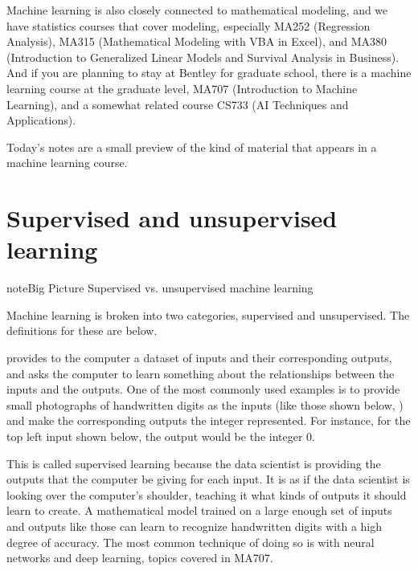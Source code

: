 \documentclass[letterpaper,10pt,english]{jupyterBook}
\begin{document}
\sphinxAtStartPar
Machine learning is also closely connected to mathematical modeling, and we have statistics courses that cover modeling, especially MA252 (Regression Analysis), MA315 (Mathematical Modeling with VBA in Excel), and MA380 (Introduction to Generalized Linear Models and Survival Analysis in Business).  And if you are planning to stay at Bentley for graduate school, there is a machine learning course at the graduate level, MA707 (Introduction to Machine Learning), and a somewhat related course CS733 (AI Techniques and Applications).

\sphinxAtStartPar
Today’s notes are a small preview of the kind of material that appears in a machine learning course.


\section{Supervised and unsupervised learning}
\label{\detokenize{chapter-17-machine-learning:supervised-and-unsupervised-learning}}
\begin{sphinxadmonition}{note}{Big Picture \sphinxhyphen{} Supervised vs. unsupervised machine learning}

\sphinxAtStartPar
Machine learning is broken into two categories, supervised and unsupervised.  The definitions for these are below.
\end{sphinxadmonition}

\sphinxAtStartPar
{} provides to the computer a dataset of inputs and their corresponding outputs, and asks the computer to learn something about the relationships between the inputs and the outputs.  One of the most commonly used examples is to provide small photographs of handwritten digits as the inputs (like those shown below, ) and make the corresponding outputs the integer represented.  For instance, for the top left input shown below, the output would be the integer 0.

\sphinxAtStartPar
{}

\sphinxAtStartPar
This is called supervised learning because the data scientist is providing the outputs that the computer  be giving for each input.  It is as if the data scientist is looking over the computer’s shoulder, teaching it what kinds of outputs it should learn to create.  A mathematical model trained on a large enough set of inputs and outputs like those can learn to recognize handwritten digits with a high degree of accuracy.  The most common technique of doing so is with neural networks and deep learning, topics covered in MA707.
\end{document}
